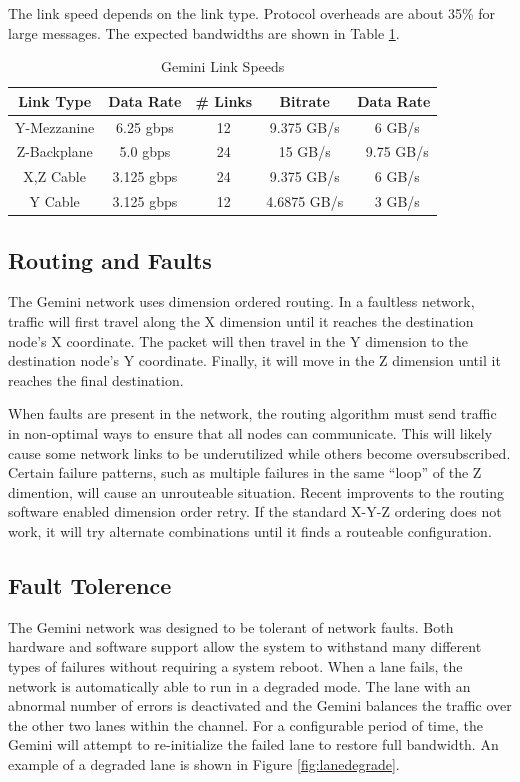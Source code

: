 \documentclass[10pt, conference, compsocconf]{IEEEtran}
\begin{document}
The link speed depends on the link type.  Protocol overheads are about 35\% for
large messages.  The expected bandwidths are shown in Table
\ref{tab:linkspeed}.

\begin{table}[h]
  \centering
  \caption{Gemini Link Speeds}
  \label{tab:linkspeed}
  \begin{tabular}{ | c | c | c | c | c | }
    \hline
    Link Type	& Data Rate	& \# Links	& Bitrate	& Data Rate	\\ \hline \hline
    Y-Mezzanine & 6.25 gbps	& 12		& 9.375 GB/s	& ~6 GB/s	\\ \hline
    Z-Backplane & 5.0 gbps	& 24		& 15 GB/s	& ~9.75 GB/s	\\ \hline
    X,Z Cable	& 3.125 gbps	& 24		& 9.375 GB/s	& ~6 GB/s	\\ \hline
    Y Cable	& 3.125 gbps	& 12		& 4.6875 GB/s	& ~3 GB/s	\\ \hline
  \end{tabular}
\end{table}

\subsection{Routing and Faults}

The Gemini network uses dimension ordered routing.  In a faultless network,
traffic will first travel along the X dimension until it reaches the
destination node's X coordinate.  The packet will then travel in the Y
dimension to the destination node's Y coordinate.  Finally, it will move in the
Z dimension until it reaches the final destination. 

When faults are present in the network, the routing algorithm must send traffic
in non-optimal ways to ensure that all nodes can communicate.  This will likely
cause some network links to be underutilized while others become
oversubscribed.  Certain failure patterns, such as multiple failures in the
same ``loop'' of the Z dimention, will cause an unrouteable situation.  Recent
improvents to the routing software enabled dimension order retry.  If the
standard X-Y-Z ordering does not work, it will try alternate combinations until
it finds a routeable configuration.

\subsection{Fault Tolerence}

The Gemini network was designed to be tolerant of network faults.  Both
hardware and software support allow the system to withstand many different
types of failures without requiring a system reboot.  When a lane fails, the
network is automatically able to run in a degraded mode.  The lane with an
abnormal number of errors is deactivated and the Gemini balances the traffic
over the other two lanes within the channel.  For a configurable period of
time, the Gemini will attempt to re-initialize the failed lane to restore full
bandwidth.  An example of a degraded lane is shown in Figure
\ref{fig:lanedegrade}. 
\end{document}
